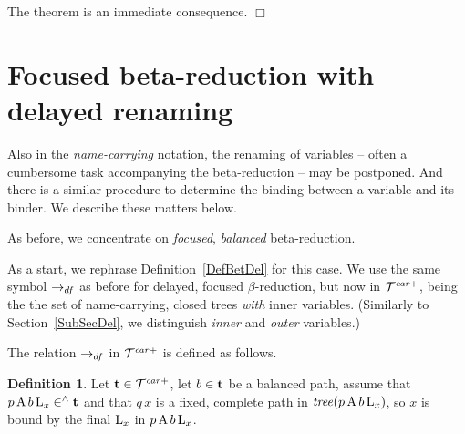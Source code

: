 \documentclass{article}
\theoremstyle{plain}
\theoremstyle{definition}
\newtheorem{Def}[The]{Definition}
\begin{document}
{The theorem is an immediate consequence. $\Box$



\section{Focused beta-reduction with delayed renaming}\label{SecDelRed}


Also in the {\em name-carrying\/} notation, the renaming of variables -- often a cumbersome task accompanying the beta-reduction -- may be postponed. And there is a similar procedure to determine the binding between a variable and its binder. We describe these matters below.

As before, we concentrate on {\em focused\/}, {\em balanced\/} beta-reduction.

\medskip

As a start, we rephrase Definition~\ref{DefBetDel} for this case. We use the same symbol $\rightarrow_{df}$ as before for delayed, focused $\beta$-reduction, but now in ${\cal T}^{\it car+}$, being the the set of name-carrying, closed trees {\it with\/} inner variables. (Similarly to Section~\ref{SubSecDel}, we distinguish {\em inner\/} and {\em outer\/} variables.)

The relation $\rightarrow_{df}$ in ${\cal T}^{\it car+}$ is defined as follows.

\begin{Def}\label{DefBetDelRen}
Let ${\bf t} \in {\cal T}^{\it car+}$, let $b \in {\bf t}$ be a balanced path, assume that $p \, {\rm A} \, b \, {\rm L}_x \in^\wedge {\bf t}$ and that $q \, x$ is a fixed, complete path in ${\it tree}(p \, {\rm A} \, b \, {\rm L}_x)$, so $x$ is bound by the final ${\rm L}_x$ in $p \, {\rm A} \, b \, {\rm L}_x$.


\end{Def}}
\end{document}

